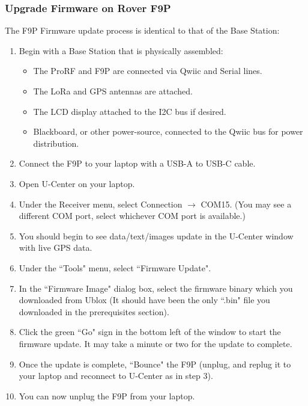 \documentclass{article}%
\begin{document}
\subsubsection{Upgrade Firmware on Rover F9P}
The F9P Firmware update process is identical to that of the Base Station:
\begin{enumerate}
	\item Begin with a Base Station that is physically assembled:
	\begin{itemize}
		\item The ProRF and F9P are connected via Qwiic and Serial lines.
		\item The LoRa and GPS antennas are attached.
		\item The LCD display attached to the I2C bus if desired.
		\item Blackboard, or other power-source, connected to the Qwiic bus for power distribution.
	\end{itemize}
	\item Connect the F9P to your laptop with a USB-A to USB-C cable.
	\item Open U-Center on your laptop.
	\item Under the Receiver menu, select Connection $\rightarrow$ COM15. (You may see a different COM port, select whichever COM port is available.)
	\item You should begin to see data/text/images update in the U-Center window with live GPS data.
	\item Under the ``Tools" menu, select ``Firmware Update".
	\item In the ``Firmware Image" dialog box, select the firmware binary which you downloaded from Ublox (It should have been the only ``.bin" file you downloaded in the prerequisites section).
	\item Click the green ``Go" sign in the bottom left of the window to start the firmware update.  It may take a minute or two for the update to complete.
	\item Once the update is complete, ``Bounce" the F9P (unplug, and replug it to your laptop and reconnect to U-Center as in step 3).
	\item You can now unplug the F9P from your laptop.
\end{enumerate}
\end{document}

